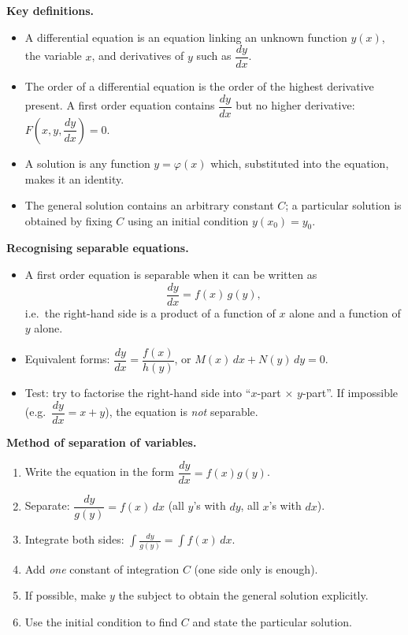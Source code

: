 \documentclass[11pt]{article}
\newcommand{\cle}[1]{{\popxbold\color{popdark}#1}}
\begin{document}
\begin{bilan}
\textbf{Key definitions.}
\begin{itemize}
  \item A \cle{differential equation} is an equation linking an unknown function $y(x)$, the variable $x$, and derivatives of $y$ such as $\dfrac{dy}{dx}$.
  \item The \cle{order} of a differential equation is the order of the highest derivative present. A \cle{first order} equation contains $\dfrac{dy}{dx}$ but no higher derivative: $F\!\left(x,y,\dfrac{dy}{dx}\right)=0$.
  \item A \cle{solution} is any function $y=\varphi(x)$ which, substituted into the equation, makes it an identity.
  \item The \cle{general solution} contains an arbitrary constant $C$; a \cle{particular solution} is obtained by fixing $C$ using an \cle{initial condition} $y(x_0)=y_0$.
\end{itemize}

\textbf{Recognising separable equations.}
\begin{itemize}
  \item A first order equation is \cle{separable} when it can be written as
  \[ \frac{dy}{dx}=f(x)\,g(y), \]
  i.e.\ the right-hand side is a product of a function of $x$ alone and a function of $y$ alone.
  \item Equivalent forms: $\dfrac{dy}{dx}=\dfrac{f(x)}{h(y)}$, or $M(x)\,dx+N(y)\,dy=0$.
  \item Test: try to factorise the right-hand side into ``$x$-part $\times$ $y$-part''. If impossible (e.g.\ $\dfrac{dy}{dx}=x+y$), the equation is \emph{not} separable.
\end{itemize}

\textbf{Method of separation of variables.}
\begin{enumerate}
  \item Write the equation in the form $\dfrac{dy}{dx}=f(x)g(y)$.
  \item Separate: $\dfrac{dy}{g(y)}=f(x)\,dx$ (all $y$'s with $dy$, all $x$'s with $dx$).
  \item Integrate both sides: $\displaystyle\int\frac{dy}{g(y)}=\int f(x)\,dx$.
  \item Add \emph{one} constant of integration $C$ (one side only is enough).
  \item If possible, make $y$ the subject to obtain the general solution explicitly.
  \item Use the initial condition to find $C$ and state the particular solution.
\end{enumerate}


\end{bilan}
\end{document}
